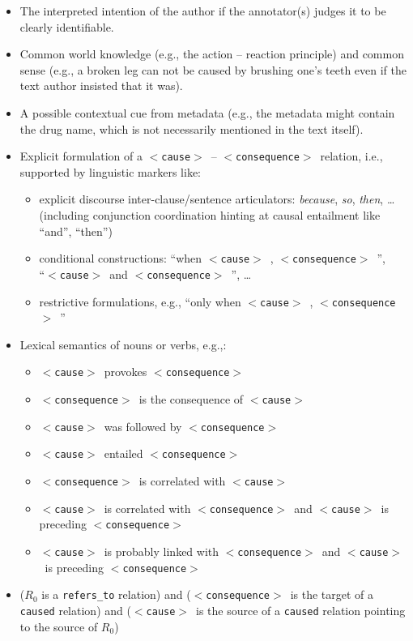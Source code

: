 \documentclass[12pt]{article}
\theoremstyle{definition}
\newcommand{\cause}{$<$\texttt{cause}$>$\ }
\newcommand{\conseq}{$<$\texttt{consequence}$>$\ }
\begin{document}
\begin{itemize}
    \item The interpreted intention of the author if the annotator(s) judges it to be clearly identifiable.
    \item Common world knowledge (e.g., the action -- reaction principle) and common sense (e.g., a broken leg can not be caused by brushing one's teeth even if the text author insisted that it was).
    \item A possible contextual cue from metadata (e.g., the metadata might contain the drug name, which is not necessarily mentioned in the text itself).
    \item Explicit formulation of a \cause-- \conseq relation, i.e., supported by linguistic markers like:
    \begin{itemize}
        \item explicit discourse inter-clause/sentence articulators: \textit{because}, \textit{so}, \textit{then}, \ldots (including conjunction coordination hinting at  causal entailment like ``and'', ``then'') %
        \item conditional constructions: ``when \cause , \conseq'',  \\ ``\cause and \conseq'', \ldots
        \item restrictive formulations, e.g., ``only when \cause , \conseq''
    \end{itemize}
    \item Lexical semantics of nouns or verbs, e.g.,:
    \begin{itemize}
        \item \cause  provokes \conseq
        \item \conseq is the consequence of \cause
        \item \cause was followed by \conseq
        \item \cause entailed \conseq
        \item \conseq is correlated with \cause
        \item \cause is correlated with \conseq and \cause is preceding \conseq
        \item \cause is probably linked with \conseq and \cause is preceding \conseq
    \end{itemize}
    \item ($R_0$ is a \texttt{refers\_to} relation) and (\conseq is the target of a \texttt{caused} relation) and (\cause is the source of a \texttt{caused} relation pointing  to the source of $R_0$)

\end{itemize}
\end{document}
